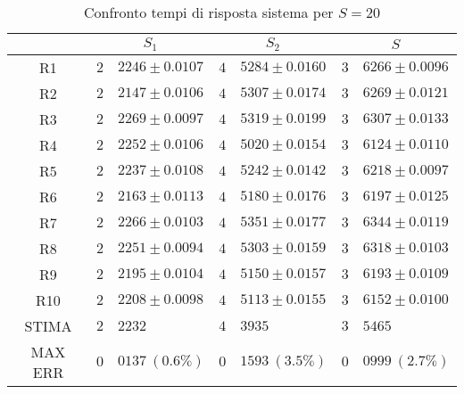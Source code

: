 \begin{table}[!h]
\begin{tabular}{c|r@{.}l|r@{.}l|r@{.}l}
& \multicolumn{2}{|c|}{$S_1$}
& \multicolumn{2}{|c|}{$S_2$}
& \multicolumn{2}{|c}{$S$} 
\\          
\hline
R1      & $2$&$2246 \pm 0.0107$ & $4$&$5284 \pm 0.0160$ & $3$&$6266 \pm 0.0096$ \\
R2      & $2$&$2147 \pm 0.0106$ & $4$&$5307 \pm 0.0174$ & $3$&$6269 \pm 0.0121$ \\
R3      & $2$&$2269 \pm 0.0097$ & $4$&$5319 \pm 0.0199$ & $3$&$6307 \pm 0.0133$ \\
R4      & $2$&$2252 \pm 0.0106$ & $4$&$5020 \pm 0.0154$ & $3$&$6124 \pm 0.0110$ \\
R5      & $2$&$2237 \pm 0.0108$ & $4$&$5242 \pm 0.0142$ & $3$&$6218 \pm 0.0097$ \\
R6      & $2$&$2163 \pm 0.0113$ & $4$&$5180 \pm 0.0176$ & $3$&$6197 \pm 0.0125$ \\
R7      & $2$&$2266 \pm 0.0103$ & $4$&$5351 \pm 0.0177$ & $3$&$6344 \pm 0.0119$ \\
R8      & $2$&$2251 \pm 0.0094$ & $4$&$5303 \pm 0.0159$ & $3$&$6318 \pm 0.0103$ \\
R9      & $2$&$2195 \pm 0.0104$ & $4$&$5150 \pm 0.0157$ & $3$&$6193 \pm 0.0109$ \\
R10     & $2$&$2208 \pm 0.0098$ & $4$&$5113 \pm 0.0155$ & $3$&$6152 \pm 0.0100$ \\
STIMA   & $2$&$2232$            & $4$&$3935$            & $3$&$5465$            \\
MAX ERR & $0$&$0137 \ (0.6\%)$    & $0$&$1593 \ (3.5\%)$    & $0$&$0999 \ (2.7\%)$    
\end{tabular}
\centering
\caption{Confronto tempi di risposta sistema per $S=20$}
\label{tab:20_s}
\end{table}
